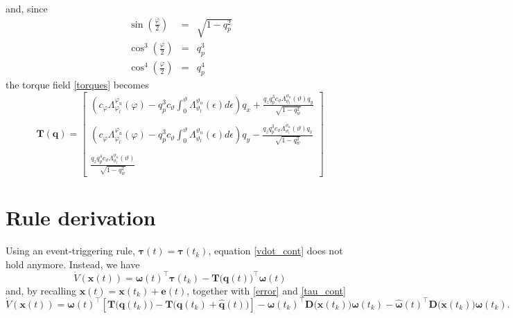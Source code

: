 \documentclass{article}
\begin{document}
		 	and, since 
		 	\begin{eqnarray*}
			 	\sin \left(\displaystyle \frac{\varphi}{2} \right) &=& \sqrt{1-q_p^2}\\
			 	\cos^3 \left(\displaystyle\frac{\varphi}{2} \right) &=& q_p^3\\
			 	\cos^4 \left(\displaystyle\frac{\varphi}{2} \right) &=& q_p^4
		 	\end{eqnarray*}
		 	the torque field \eqref{torques} becomes
		 	\begin{equation}
		 		\mathbf{T(q)} = \begin{bmatrix}
		 					\displaystyle \left ( c_\varphi \Lambda_{\varphi_l}^{\varphi_u}(\varphi) - q_p^3 c_\vartheta \int_0^\vartheta{\Lambda_{\vartheta_l}^{\vartheta_u}(\epsilon)} d\epsilon \right ) q_x + \frac{q_z q_p^3 c_\vartheta \Lambda_{\vartheta_l}^{\vartheta_u}(\vartheta) q_y}{\sqrt{1-q_w^2}}\\ \\
		 					\displaystyle \left ( c_\varphi \Lambda_{\varphi_l}^{\varphi_u}(\varphi) - q_p^3 c_\vartheta \int_0^\vartheta{\Lambda_{\vartheta_l}^{\vartheta_u}(\epsilon)} d\epsilon \right ) q_y - \frac{q_z q_p^3 c_\vartheta \Lambda_{\vartheta_l}^{\vartheta_u}(\vartheta) q_x}{\sqrt{1-q_w^2}}\\ \\
							\displaystyle \frac{q_z q_p^4 c_\vartheta \Lambda_{\vartheta_l}^{\vartheta_u}(\vartheta)}{\sqrt{1-q_w^2}}	 		
		 				\end{bmatrix}
		 		\label{torques_vec}
		 	\end{equation}

	\section{Rule derivation}
		Using an event-triggering rule, $\boldsymbol \tau(t) = \boldsymbol \tau(t_k)$, equation \eqref{vdot_cont} does not hold anymore. Instead, we have
		\[
			\dot V(\mathbf{x}(t)) = \boldsymbol \omega (t)^\top \boldsymbol \tau(t_k) - \mathbf{T(q}(t))^\top\boldsymbol \omega(t)
		\]
		and, by recalling $\mathbf{x}(t) = \mathbf{x}(t_k) + \mathbf{e}(t)$, together with \eqref{error} and \eqref{tau_cont}
		\[
			\dot V(\mathbf{x}(t)) = \boldsymbol \omega(t)^\top \left [ \mathbf{T(q}(t_k)) - \mathbf{T(q}(t_k) + \mathbf{\hat{q}}(t)) \right ] - \boldsymbol \omega(t_k)^\top \mathbf{D(x}(t_k)) \boldsymbol \omega(t_k) -  \hat{\boldsymbol \omega}(t)^\top \mathbf{D(x}(t_k)) \boldsymbol \omega(t_k).
		\]
		
\end{document}
